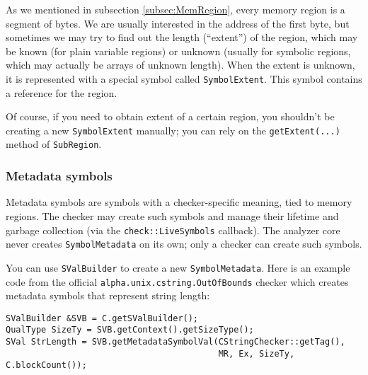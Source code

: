 \documentclass[a4paper,12pt]{article}
\newenvironment{nobr}{\begin{minipage}{\textwidth}\setlength\parskip{1em}
}{\end{minipage}\ignorespacesafterend}
\begin{document}
As we mentioned in subsection \ref{subsec:MemRegion}, every memory region is a segment of bytes. We are usually interested in the address of the first byte, but sometimes we may try to find out the length (``extent'') of the region, which may be known (for plain variable regions) or unknown (usually for symbolic regions, which may actually be arrays of unknown length). When the extent is unknown, it is represented with a special symbol called \lstinline|SymbolExtent|. This symbol contains a reference for the region.

Of course, if you need to obtain extent of a certain region, you shouldn't be creating a new \lstinline|SymbolExtent| manually; you can rely on the \lstinline|getExtent(...)| method of \lstinline|SubRegion|.

\subsubsection{Metadata symbols}\label{subsubsec:metadata}

Metadata symbols are symbols with a checker-specific meaning, tied to memory regions. The checker may create such symbols and manage their lifetime and garbage collection (via the \lstinline|check::LiveSymbols| callback). The analyzer core never creates \lstinline|SymbolMetadata| on its own; only a checker can create such symbols.

\begin{nobr}
You can use \lstinline|SValBuilder| to create a new \lstinline|SymbolMetadata|. Here is an example code from the official \lstinline|alpha.unix.cstring.OutOfBounds| checker which creates metadata symbols that represent string length:

\begin{lstlisting}[style=cplusplus, numbers=none]
SValBuilder &SVB = C.getSValBuilder();
QualType SizeTy = SVB.getContext().getSizeType();
SVal StrLength = SVB.getMetadataSymbolVal(CStringChecker::getTag(),
                                          MR, Ex, SizeTy, C.blockCount());
\end{lstlisting}
\end{nobr}
\end{document}
